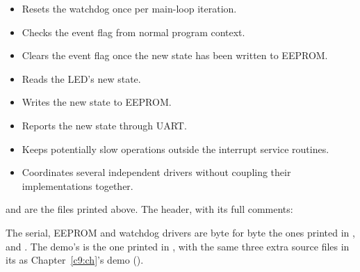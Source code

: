 \begin{itemize}
\begin{itemize}
    \item Resets the watchdog once per main-loop iteration.
    \item Checks the event flag from normal program context.
    \item Clears the event flag once the new state has been written to EEPROM.
    \item Reads the LED's new state.
    \item Writes the new state to EEPROM.
    \item Reports the new state through UART.
    \item Keeps potentially slow operations outside the interrupt service routines.
    \item Coordinates several independent drivers without coupling their implementations together.
  \end{itemize}
\end{itemize}
 and  are the files printed above. The header, with its full
comments:


\noindent The serial, EEPROM and watchdog drivers are byte for byte the ones printed in
,  and . The demo's  is the one printed
in , with the same three extra source files in its  as
Chapter~\ref{c9:ch}'s demo ().

